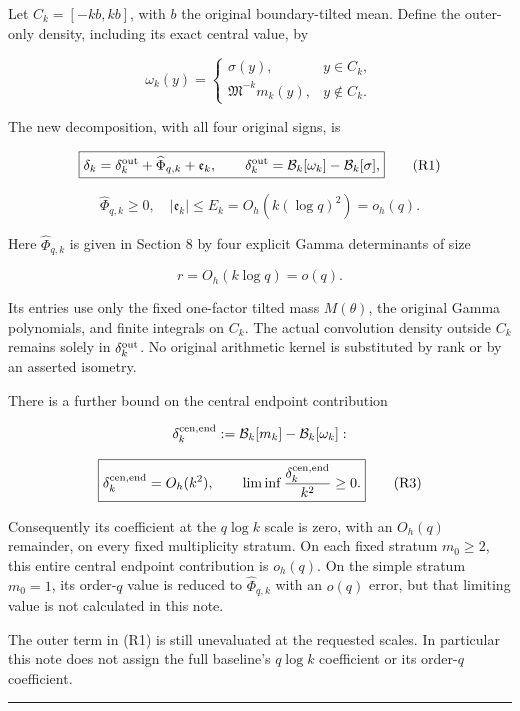 Let \(C_k=[-kb,kb]\), with \(b\) the original boundary-tilted mean. Define the outer-only density, including its exact central value, by

\[
\omega_k(y)=
\begin{cases}\sigma(y),&y\in C_k,\\
\mathfrak M^{-k}m_k(y),&y\notin C_k.
\end{cases}
\]

The new decomposition, with all four original signs, is

\[
\boxed{\delta_k=\delta_k^{\rm out}+\widehat\Phi_{q,k}+\mathfrak e_k,
\qquad \delta_k^{\rm out}=\mathcal B_k[\omega_k]-\mathcal B_k[\sigma],}
\tag{R1}
\]

\[
\boxed{\widehat\Phi_{q,k}\ge0,\quad
|\mathfrak e_k|\le E_k=O_h(k(\log q)^2)=o_h(q).}
\tag{R2}
\]

Here \(\widehat\Phi_{q,k}\) is given in Section 8 by four explicit Gamma determinants of size

\[
r=O_h(k\log q)=o(q).
\]

Its entries use only the fixed one-factor tilted mass \(M(\theta)\), the original Gamma polynomials, and finite integrals on \(C_k\). The actual convolution density outside \(C_k\) remains solely in \(\delta_k^{\rm out}\). No original arithmetic kernel is substituted by rank or by an asserted isometry.

There is a further bound on the central endpoint contribution

\[
\delta_k^{\rm cen,end}:=\mathcal B_k[m_k]-\mathcal B_k[\omega_k]:
\]

\[
\boxed{\delta_k^{\rm cen,end}=O_h(k^2),\qquad
\liminf\frac{\delta_k^{\rm cen,end}}{k^2}\ge0.}
\tag{R3}
\]

Consequently its coefficient at the \(q\log k\) scale is zero, with an \(O_h(q)\) remainder, on every fixed multiplicity stratum. On each fixed stratum \(m_0\ge2\), this entire central endpoint contribution is \(o_h(q)\). On the simple stratum \(m_0=1\), its order-\(q\) value is reduced to \(\widehat\Phi_{q,k}\) with an \(o(q)\) error, but that limiting value is not calculated in this note.

The outer term in (R1) is still unevaluated at the requested scales. In particular this note does not assign the full baseline's \(q\log k\) coefficient or its order-\(q\) coefficient.

\begin{center}\rule{0.5\linewidth}{0.5pt}\end{center}

